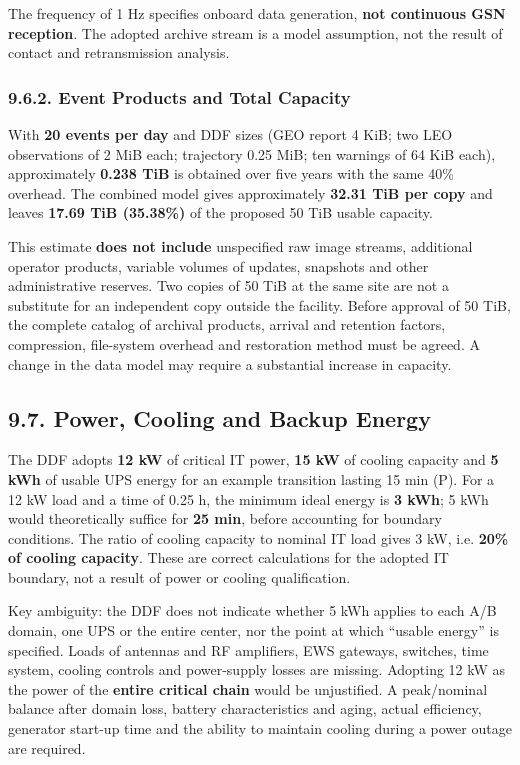 The frequency of 1 Hz specifies onboard data generation, \textbf{not continuous GSN reception}. The adopted archive stream is a model assumption, not the result of contact and retransmission analysis.

\subsubsection{9.6.2. Event Products and Total Capacity}\label{ddjf-9-6-2}

With \textbf{20 events per day} and DDF sizes (GEO report 4 KiB; two LEO observations of 2 MiB each; trajectory 0.25 MiB; ten warnings of 64 KiB each), approximately \textbf{0.238 TiB} is obtained over five years with the same 40\% overhead. The combined model gives approximately \textbf{32.31 TiB per copy} and leaves \textbf{17.69 TiB (35.38\%)} of the proposed 50 TiB usable capacity.

This estimate \textbf{does not include} unspecified raw image streams, additional operator products, variable volumes of updates, snapshots and other administrative reserves. Two copies of 50 TiB at the same site are not a substitute for an independent copy outside the facility. Before approval of 50 TiB, the complete catalog of archival products, arrival and retention factors, compression, file-system overhead and restoration method must be agreed. A change in the data model may require a substantial increase in capacity.

\subsection{9.7. Power, Cooling and Backup Energy}\label{ddjf-9-7}

The DDF adopts \textbf{12 kW} of critical IT power, \textbf{15 kW} of cooling capacity and \textbf{5 kWh} of usable UPS energy for an example transition lasting 15 min (P). For a 12 kW load and a time of 0.25 h, the minimum ideal energy is \textbf{3 kWh}; 5 kWh would theoretically suffice for \textbf{25 min}, before accounting for boundary conditions. The ratio of cooling capacity to nominal IT load gives 3 kW, i.e. \textbf{20\% of cooling capacity}. These are correct calculations for the adopted IT boundary, not a result of power or cooling qualification.

Key ambiguity: the DDF does not indicate whether 5 kWh applies to each A/\allowbreak{}B domain, one UPS or the entire center, nor the point at which “usable energy” is specified. Loads of antennas and RF amplifiers, EWS gateways, switches, time system, cooling controls and power-supply losses are missing. Adopting 12 kW as the power of the \textbf{entire critical chain} would be unjustified. A peak/\allowbreak{}nominal balance after domain loss, battery characteristics and aging, actual efficiency, generator start-up time and the ability to maintain cooling during a power outage are required.

